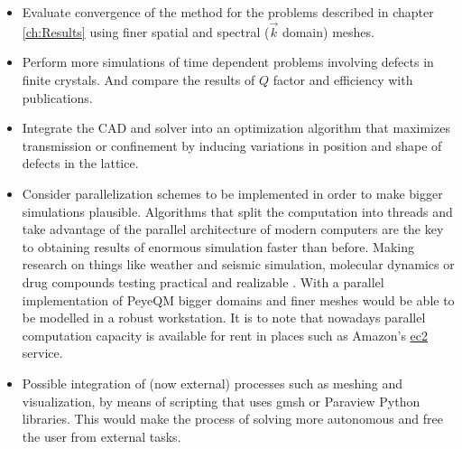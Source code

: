 \begin{itemize}
%
\item Evaluate convergence of the method for the problems described in chapter \ref{ch:Results} using finer spatial and spectral ($\vec{k}$ domain) meshes.
%
\item Perform more simulations of time dependent problems involving defects in finite crystals. And compare the results of $Q$ factor and efficiency with  publications.
%
\item Integrate the CAD and solver into an optimization algorithm that maximizes transmission or confinement by inducing variations in position and shape of defects in the lattice.
%
\item Consider parallelization schemes to be implemented in order to make bigger simulations plausible. Algorithms that split the computation into threads and take advantage of the parallel architecture of modern computers are the key to obtaining results of enormous simulation faster than before. Making research on things like weather and seismic simulation, molecular dynamics or drug compounds testing practical and realizable . With a parallel implementation of PeyeQM bigger domains and finer meshes would be able to be modelled in a robust workstation. It is to note that nowadays parallel computation capacity is available for rent in places such as Amazon's \href{http://aws.amazon.com/ec2/}{ec2} service.
\item Possible integration of (now external) processes such as meshing and visualization, by means of scripting that uses gmsh or Paraview Python libraries. This would make the process of solving more autonomous and free the user from external tasks.
\end{itemize}


